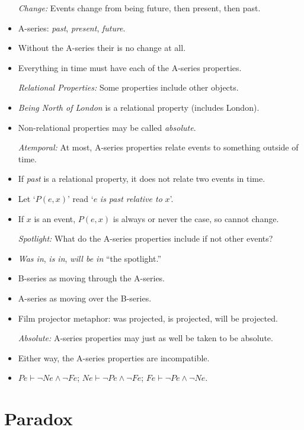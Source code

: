 \documentclass[a4paper, 11pt]{article} %
\begin{document}
\begin{itemize}
  \item[\it Change:] Events change from being future, then present, then past.
    \item A-series: \textit{past}, \textit{present}, \textit{future}.
    \item Without the A-series their is no change at all.
    \item Everything in time must have each of the A-series properties.
  \item[\it Relational Properties:] Some properties include other objects.
    \item \textit{Being North of London} is a relational property (includes London).
    \item Non-relational properties may be called \textit{absolute}.
  \item[\it Atemporal:] At most, A-series properties relate events to something outside of time.
    \item If \textit{past} is a relational property, it does not relate two events in time.
    \item Let `$P(e,x)$' read `$e$ \textit{is past relative to} $x$'.
    \item If $x$ is an event, $P(e,x)$ is always or never the case, so cannot change. 
  \item[\it Spotlight:] What do the A-series properties include if not other events?
    \item \textit{Was in}, \textit{is in}, \textit{will be in} ``the spotlight.''
    \item B-series as moving through the A-series.
    \item A-series as moving over the B-series.
    \item Film projector metaphor: was projected, is projected, will be projected.
  \item[\it Absolute:] A-series properties may just as well be taken to be absolute.
    \item Either way, the A-series properties are incompatible.
    \item $Pe \vdash \neg Ne \wedge \neg Fe$; $Ne \vdash \neg Pe \wedge \neg Fe$; $Fe \vdash \neg Pe \wedge \neg Ne$.
    
\end{itemize}






\section*{Paradox}
\end{document}
